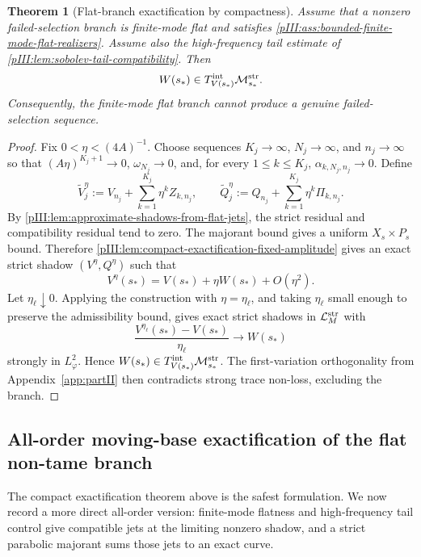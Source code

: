 \documentclass[11pt]{article}
\numberwithin{equation}{section}
\theoremstyle{plain}
\newtheorem{theorem}{Theorem}[section]
\theoremstyle{definition}
\theoremstyle{remark}
\newcommand{\Mstr}{\mathcal M^{\rm str}}
\newcommand{\Lstr}{\mathcal L^{\rm str}}
\newcommand{\Tint}{T^{\rm int}}
\begin{document}
\begin{theorem}[Flat-branch exactification by compactness]
\label{pIII:thm:flat-branch-exactification}
Assume that a nonzero failed-selection branch is finite-mode flat and satisfies
\cref{pIII:ass:bounded-finite-mode-flat-realizers}.  Assume also the high-frequency tail estimate of
\cref{pIII:lem:sobolev-tail-compatibility}.  Then
\[
        W(s_*)\in \Tint_{V(s_*)}\Mstr_{s_*}.
\]
Consequently, the finite-mode flat branch cannot produce a genuine failed-selection sequence.
\end{theorem}

\begin{proof}
Fix \(0<\eta<(4A)^{-1}\).  Choose sequences \(K_j\to\infty\), \(N_j\to\infty\), and
\(n_j\to\infty\) so that \((A\eta)^{K_j+1}\to0\), \(\omega_{N_j}\to0\), and, for every
\(1\le k\le K_j\), \(\alpha_{k,N_j,n_j}\to0\).  Define
\[
        \widetilde V_j^\eta
        :=
        V_{n_j}+\sum_{k=1}^{K_j}\eta^kZ_{k,n_j},
        \qquad
        \widetilde Q_j^\eta
        :=
        Q_{n_j}+\sum_{k=1}^{K_j}\eta^k\Pi_{k,n_j}.
\]
By \cref{pIII:lem:approximate-shadows-from-flat-jets}, the strict residual and compatibility residual tend
to zero.  The majorant bound gives a uniform \(X_s\times P_s\) bound.  Therefore
\cref{pIII:lem:compact-exactification-fixed-amplitude} gives an exact strict shadow \((V^\eta,Q^\eta)\)
such that
\[
        V^\eta(s_*)=V(s_*)+\eta W(s_*)+O(\eta^2).
\]
Let \(\eta_\ell\downarrow0\).  Applying the construction with \(\eta=\eta_\ell\), and taking
\(\eta_\ell\) small enough to preserve the admissibility bound, gives exact strict shadows in
\(\Lstr_M\) with
\[
        \frac{V^{\eta_\ell}(s_*)-V(s_*)}{\eta_\ell}\to W(s_*)
\]
strongly in \(L^2_\varphi\).  Hence \(W(s_*)\in\Tint_{V(s_*)}\Mstr_{s_*}\).  The first-variation
orthogonality from Appendix~\ref{app:partII} then contradicts strong trace non-loss, excluding the branch.
\end{proof}

\subsection{All-order moving-base exactification of the flat non-tame branch}
\label{pIII:sec:all-order-moving-base-exactification}

The compact exactification theorem above is the safest formulation.  We now record a more direct
all-order version: finite-mode flatness and high-frequency tail control give compatible jets at the
limiting nonzero shadow, and a strict parabolic majorant sums those jets to an exact curve.
\end{document}
